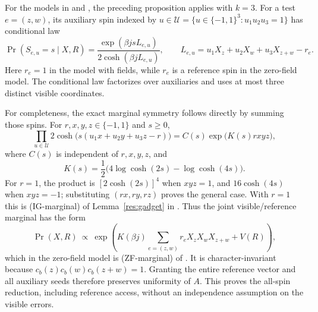 \begin{remark}\label{ian:adaptive-character-gadget-simulation}
For the models in
 and
,
the preceding proposition applies with \(k=3\).
For a test \(e=(z,w)\), its auxiliary spin indexed by
\(u\in\mathcal U=\{u\in\{-1,1\}^3:u_1u_2u_3=1\}\) has conditional law
\[
 \Pr(S_{e,u}=s\mid X,R)
 =
 \frac{\exp(\beta j s L_{e,u})}{2\cosh(\beta j L_{e,u})},
 \qquad
 L_{e,u}=u_1X_z+u_2X_w+u_3X_{z+w}-r_e.
\]
Here \(r_e=1\) in the model with fields, while \(r_e\) is a reference spin in the zero-field model. The conditional law factorizes over auxiliaries and uses at most three distinct visible coordinates.

For completeness, the exact marginal symmetry follows directly by summing those spins. For \(r,x,y,z\in\{-1,1\}\) and \(s\ge0\),
\[
 \prod_{u\in\mathcal U}2\cosh\bigl(s(u_1x+u_2y+u_3z-r)\bigr)
 =
 C(s)\exp\bigl(K(s)rxyz\bigr),
\]
where \(C(s)\) is independent of \(r,x,y,z\), and
\[
 K(s)=\frac12\bigl(4\log\cosh(2s)-\log\cosh(4s)\bigr).
\]
For \(r=1\), the product is \([2\cosh(2s)]^4\) when \(xyz=1\), and \(16\cosh(4s)\) when \(xyz=-1\); substituting \((rx,ry,rz)\) proves the general case. With \(r=1\) this is (IG-marginal) of Lemma~\ref{res:gadget} in
. Thus the joint visible/reference marginal has the form
\[
 \Pr(X,R)\ \propto\
 \exp\left(
 K(\beta j)\sum_{e=(z,w)}r_eX_zX_wX_{z+w}+V(R)
 \right),
\]
which in the zero-field model is (ZF-marginal) of
.
It is character-invariant because
\(c_b(z)c_b(w)c_b(z+w)=1\).
Granting the entire reference vector and all auxiliary seeds therefore preserves uniformity of \(A\). This proves the all-spin reduction, including reference access, without an independence assumption on the visible errors.
\end{remark}

